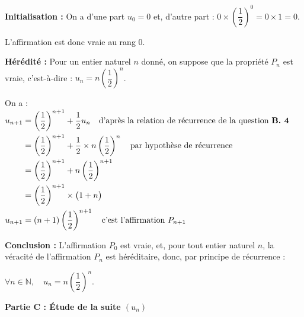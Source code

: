 \documentclass[10pt]{article}
\providecommand{\N}{\mathbb{N}}
\begin{document}
\begin{enumerate}
\textbf{Initialisation :} On a d'une part $u_0 = 0$ et, d'autre part : $0\times\left(\dfrac{1}{2}\right)^0 = 0\times 1 = 0 $.

L'affirmation est donc vraie au rang 0.

\textbf{Hérédité :} Pour un entier naturel $n$ donné, on suppose que la propriété $P_n$ est vraie, c'est-à-dire : $u_n = n\left(\dfrac{1}{2}\right)^n$.

On a : \quad
$\begin{aligned}[t]
u_{n+1} &= \left(\dfrac{1}{2}\right)^{n+1} + \dfrac{1}{2}u_n \quad \text{d'après la relation de récurrence de la question \textbf{B. 4}}\\
	& = \left(\dfrac{1}{2}\right)^{n+1} + \dfrac{1}{2}\times n\left(\dfrac{1}{2}\right)^{n}\quad\text{par hypothèse de récurrence}\\
	& = \left(\dfrac{1}{2}\right)^{n+1} + n\left(\dfrac{1}{2}\right)^{n+1}\\
	& = \left(\dfrac{1}{2}\right)^{n+1}\times\big(1 +n\big)\\
	u_{n+1}&=(n+1)\left(\dfrac{1}{2}\right)^{n+1} \quad \text{c'est l'affirmation }P_{n+1}
\end{aligned}$

\textbf{Conclusion :} L'affirmation $P_0$ est vraie, et, pour tout entier naturel $n$, la véracité de l'affirmation $P_n$ est héréditaire, donc, par principe de récurrence :

$\forall n \in \N,\quad u_n = n\left(\dfrac{1}{2}\right) ^{n}$.
\end{enumerate}

\medskip

\textbf{Partie C : Étude de la suite \boldmath$(u_{n})$\unboldmath}

\medskip
\end{document}
